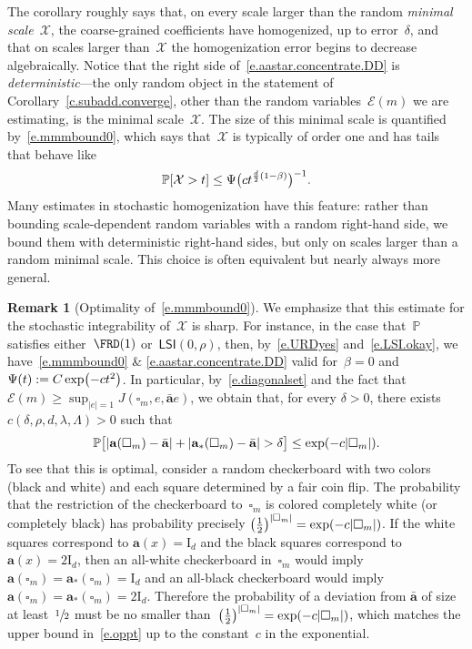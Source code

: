 \documentclass[11pt]{article} %
\let\oldsquare\square %
\renewcommand{\square}{\oldsquare}
\numberwithin{equation}{section}
\theoremstyle{definition}
\newtheorem{remark}[theorem]{Remark}
\let\originalleft\left
\let\originalright\right
\renewcommand{\left}{\mathopen{}\mathclose\bgroup\originalleft}
\renewcommand{\right}{\aftergroup\egroup\originalright}
\newcommand*{\Id}{\ensuremath{\mathrm{I}_d}}
\renewcommand{\a}{\mathbf{a}}
\newcommand{\ahom}{\bar{\a}}
\newcommand{\cu}{\square}
\renewcommand{\P}{\mathbb{P}}
\newcommand{\X}{\mathcal{X}}
\newcommand{\LSI}{\mathsf{LSI}}
\begin{document}
The corollary roughly says that, on every scale larger than the random \emph{minimal scale}~$\X$, the coarse-grained coefficients have homogenized, up to error~$\delta$, and that on scales larger than~$\X$ the homogenization error begins to decrease algebraically. Notice that the right side of~\eqref{e.aastar.concentrate.DD} is \emph{deterministic}---the only random object in the statement of Corollary~\ref{c.subadd.converge}, other than the random variables~$\mathcal{E}(m)$ we are estimating, is the minimal scale~$\X$. 
The size of this minimal scale is quantified by~\eqref{e.mmmbound0}, which says that~$\X$ is typically of order one and has tails that behave like 
\begin{equation*}
\P \left[ \X > t \right] 
\leq 
\Psi\bigl( ct^{\frac d2(1-\beta)} \bigr)^{-1}. 
\end{equation*}
Many estimates in stochastic homogenization have this feature: rather than bounding scale-dependent random variables with a random right-hand side, we bound them with deterministic right-hand sides, but only on scales larger than a random minimal scale. This choice is often equivalent but nearly always more general. 

\smallskip

\begin{remark}[{Optimality of~\eqref{e.mmmbound0}}]
\label{r.X.optimal}
We emphasize that this estimate for the stochastic integrability of~$\X$ is sharp. 
For instance, in the case that~$\P$ satisfies either~$\FRD(1)$ or~$\LSI(0,\rho)$, then, by~\eqref{e.URDyes} and~\eqref{e.LSI.okay}, we have~\eqref{e.mmmbound0} \& \eqref{e.aastar.concentrate.DD} valid for~$\beta=0$ and~$\Psi(t):= C\exp\left( -ct^2 \right)$. 
In particular, by~\eqref{e.diagonalset} and the fact that~$\mathcal{E}(m) \geq \sup_{|e|=1} J(\cu_m,e,\ahom e)$, we obtain that, for every $\delta>0$, there exists $c(\delta,\rho,d,\lambda,\Lambda)>0$ such that 
\begin{equation} 
\label{e.oppt}
\P \big[ 
\left| \a(\cu_m) - \ahom \right|
+ \left| \a_*(\cu_m) - \ahom \right|
> \delta 
\big]
\leq \exp \left( -c\left| \cu_m \right| \right). 
\end{equation}
To see that this is optimal, consider a random checkerboard with two colors (black and white) and each square determined by a fair coin flip. The probability that the restriction of the checkerboard to~$\cu_m$ is colored completely white (or completely black) has probability precisely $\left( \frac12 \right)^{|\cu_m|} = \exp\left( -c\left| \cu_m\right| \right)$. If the white squares correspond to $\a(x) =  \Id$ and the black squares correspond to $\a(x) =2 \Id$, then an all-white checkerboard in~$\cu_m$ would imply $\a(\cu_m) = \a_*(\cu_m) =  \Id$ and an all-black checkerboard would imply~$\a(\cu_m) = \a_*(\cu_m) =2  \Id$. Therefore the probability of a deviation from $\ahom$ of size at least~$\sfrac12$ must be no smaller than~$\left( \frac12 \right)^{|\cu_m|} = \exp\left( -c\left| \cu_m\right| \right)$, which matches the upper bound in~\eqref{e.oppt} up to the constant~$c$ in the exponential. 
\end{remark}
\end{document}
